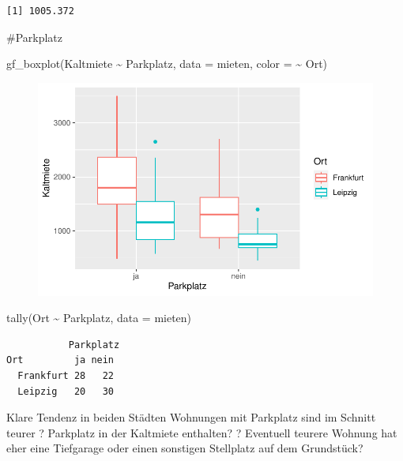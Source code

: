 \documentclass[
  a4paper,
  DIV=11]{scrartcl}
\newenvironment{Shaded}{\begin{snugshade}}{\end{snugshade}}
\newcommand{\AttributeTok}[1]{\textcolor[rgb]{0.40,0.45,0.13}{#1}}
\newcommand{\FunctionTok}[1]{\textcolor[rgb]{0.28,0.35,0.67}{#1}}
\newcommand{\NormalTok}[1]{\textcolor[rgb]{0.00,0.23,0.31}{#1}}
\newcommand{\SpecialCharTok}[1]{\textcolor[rgb]{0.37,0.37,0.37}{#1}}
\begin{document}
\begin{verbatim}
[1] 1005.372
\end{verbatim}

\#Parkplatz

\begin{Shaded}
\begin{Highlighting}[]
\FunctionTok{gf\_boxplot}\NormalTok{(Kaltmiete }\SpecialCharTok{\textasciitilde{}}\NormalTok{ Parkplatz, }\AttributeTok{data =}\NormalTok{ mieten, }\AttributeTok{color =} \SpecialCharTok{\textasciitilde{}}\NormalTok{ Ort)}
\end{Highlighting}
\end{Shaded}

\begin{figure}[H]

{\centering \includegraphics{Mietmodellierung_files/figure-pdf/unnamed-chunk-12-1.pdf}

}

\end{figure}

\begin{Shaded}
\begin{Highlighting}[]
\FunctionTok{tally}\NormalTok{(Ort }\SpecialCharTok{\textasciitilde{}}\NormalTok{ Parkplatz, }\AttributeTok{data =}\NormalTok{ mieten)}
\end{Highlighting}
\end{Shaded}

\begin{verbatim}
           Parkplatz
Ort         ja nein
  Frankfurt 28   22
  Leipzig   20   30
\end{verbatim}

Klare Tendenz in beiden Städten Wohnungen mit Parkplatz sind im Schnitt
teurer ? Parkplatz in der Kaltmiete enthalten? ? Eventuell teurere
Wohnung hat eher eine Tiefgarage oder einen sonstigen Stellplatz auf dem
Grundstück?
\end{document}

